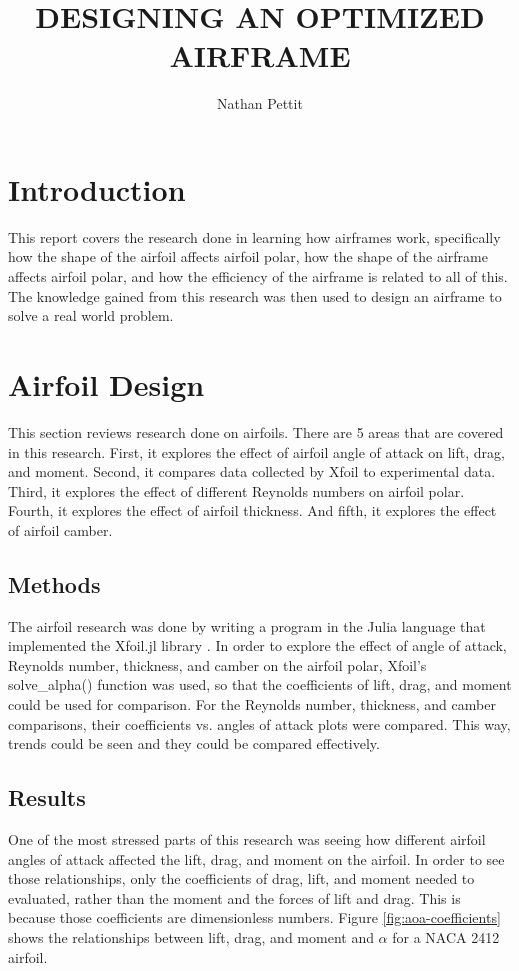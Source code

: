 \documentclass{journal}
\title{DESIGNING AN OPTIMIZED AIRFRAME}
\author{Nathan Pettit}
\begin{document}
	
	\maketitle	
	\section{Introduction}
	This report covers the research done in learning how airframes work, specifically how the shape of the airfoil affects airfoil polar, how the shape of the airframe affects airfoil polar, and how the efficiency of the airframe is related to all of this. The knowledge gained from this research was then used to design an airframe to solve a real world problem.\\
	
	\section{Airfoil Design}
	This section reviews research done on airfoils. There are 5 areas that are covered in this research. First, it explores the effect of airfoil angle of attack on lift, drag, and moment. Second, it compares data collected by Xfoil to experimental data. Third, it explores the effect of different Reynolds numbers on airfoil polar. Fourth, it explores the effect of airfoil thickness. And fifth, it explores the effect of airfoil camber.\\
	
	\subsection{Methods}
	The airfoil research was done by writing a program in the Julia language that implemented the Xfoil.jl library \cite{McDonnell}. In order to explore the effect of angle of attack, Reynolds number, thickness, and camber on the airfoil polar, Xfoil's solve\_alpha() function was used, so that the coefficients of lift, drag, and moment could be used for comparison. For the Reynolds number, thickness, and camber comparisons, their coefficients vs. angles of attack plots were compared. This way, trends could be seen and they could be compared effectively.
	
	\subsection{Results}
	One of the most stressed parts of this research was seeing how different airfoil angles of attack affected the lift, drag, and moment on the airfoil. In order to see those relationships, only the coefficients of drag, lift, and moment needed to evaluated, rather than the moment and the forces of lift and drag. This is because those coefficients are dimensionless numbers. Figure \ref{fig:aoa-coefficients} shows the relationships between lift, drag, and moment and \(\alpha\) for a NACA 2412 airfoil.\\
	
\end{document}
